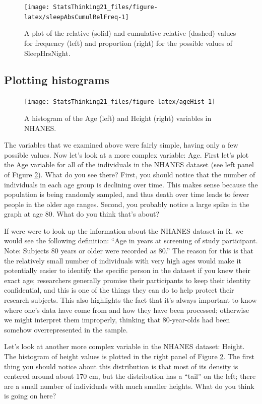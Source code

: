\documentclass[12pt,]{book}
\theoremstyle{definition}
\theoremstyle{definition}
\theoremstyle{definition}
\theoremstyle{remark}
\begin{document}
\begin{figure}
\texttt{[image: StatsThinking21\_files/figure-latex/sleepAbsCumulRelFreq-1]} \caption{A plot of the relative (solid) and cumulative relative (dashed) values for frequency (left) and proportion (right) for the possible values of SleepHrsNight.}\label{fig:sleepAbsCumulRelFreq}
\end{figure}

\hypertarget{plotting-histograms}{%
\subsection{Plotting histograms}\label{plotting-histograms}}

\begin{figure}
\texttt{[image: StatsThinking21\_files/figure-latex/ageHist-1]} \caption{A histogram of the Age (left) and Height (right) variables in NHANES.}\label{fig:ageHist}
\end{figure}

The variables that we examined above were fairly simple, having only a few possible values. Now let's look at a more complex variable: Age. First let's plot the Age variable for all of the individuals in the NHANES dataset (see left panel of Figure \ref{fig:ageHist}). What do you see there? First, you should notice that the number of individuals in each age group is declining over time. This makes sense because the population is being randomly sampled, and thus death over time leads to fewer people in the older age ranges. Second, you probably notice a large spike in the graph at age 80. What do you think that's about?

If were were to look up the information about the NHANES dataset in R, we would see the following definition: ``Age in years at screening of study participant. Note: Subjects 80 years or older were recorded as 80.'' The reason for this is that the relatively small number of individuals with very high ages would make it potentially easier to identify the specific person in the dataset if you knew their exact age; researchers generally promise their participants to keep their identity confidential, and this is one of the things they can do to help protect their research subjects. This also highlights the fact that it's always important to know where one's data have come from and how they have been processed; otherwise we might interpret them improperly, thinking that 80-year-olds had been somehow overrepresented in the sample.

Let's look at another more complex variable in the NHANES dataset: Height. The histogram of height values is plotted in the right panel of Figure \ref{fig:ageHist}. The first thing you should notice about this distribution is that most of its density is centered around about 170 cm, but the distribution has a ``tail'' on the left; there are a small number of individuals with much smaller heights. What do you think is going on here?
\end{document}
